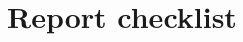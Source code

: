 \documentclass{article}
\newif\ifshowguide
\newcommand{\guide}[1]{%
  \ifshowguide
    \par\medskip\noindent
    \fcolorbox{blue!50}{blue!4}{%
      \begin{minipage}{\dimexpr\linewidth-2\fboxsep-2\fboxrule\relax}
        \small\color{blue!55!black}\textbf{Guidance.} #1
      \end{minipage}}%
    \par\medskip
  \fi}
\begin{document}

\FloatBarrier

\section{Report checklist}
\guide{Mandatory. Before submitting, answer each item with \textbf{[Yes]},
\textbf{[No]} or \textbf{[NA]}, and add a one-line justification for any [No].}
\end{document}
